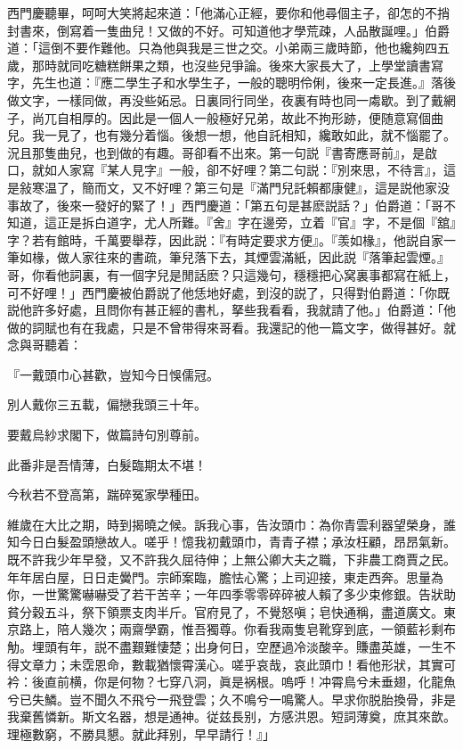 西門慶聽畢，呵呵大笑將起來道：「他滿心正經，要你和他尋個主子，卻怎的不捎封書來，倒寫着一隻曲兒！又做的不好。可知道他才學荒疎，人品散誕哩。」伯爵道：「這倒不要作難他。只為他與我是三世之交。小弟兩三歲時節，他也纔夠四五歲，那時就同吃糖糕餅果之類，也沒些兒爭論。後來大家長大了，上學堂讀書寫字，先生也道：『應二學生子和水學生子，一般的聰明伶俐，後來一定長進。』落後做文字，一樣同做，再没些妬忌。日裏同行同坐，夜裏有時也同一䖏歇。到了戴網子，尚兀自相厚的。因此是一個人一般極好兄弟，故此不拘形跡，便随意寫個曲兒。我一見了，也有幾分着惱。後想一想，他自託相知，纔敢如此，就不惱罷了。況且那隻曲兒，也到做的有趣。哥卻看不出來。第一句説『書寄應哥前』，是啟口，就如人家寫『某人見字』一般，卻不好哩？第二句説：『別來思，不待言』，這是敍寒温了，簡而文，又不好哩？第三句是『滿門兒託賴都康健』，這是説他家没事故了，後來一發好的緊了！」西門慶道：「第五句是甚麽説話？」伯爵道：「哥不知道，這正是拆白道字，尤人所難。『舍』字在邊旁，立着『官』字，不是個『舘』字？若有館時，千萬要舉荐，因此説：『有時定要求方便』。『羡如椽』，他説自家一筆如椽，做人家往來的書疏，筆兒落下去，其煙雲滿紙，因此説『落筆起雲煙。』哥，你看他詞裏，有一個字兒是閒話麽？只這幾句，穩穩把心窝裏事都寫在紙上，可不好哩！」西門慶被伯爵説了他恁地好處，到沒的説了，只得對伯爵道：「你既説他許多好處，且問你有甚正經的書札，拏些我看看，我就請了他。」伯爵道：「他做的詞賦也有在我處，只是不曾带得來哥看。我還記的他一篇文字，做得甚好。就念與哥聽着：

\begin{myquote}
『一戴頭巾心甚歡，豈知今日悞儒冠。

別人戴你三五載，偏戀我頭三十年。

要戴烏紗求閣下，做篇詩句別尊前。

此番非是吾情薄，白髮臨期太不堪！

今秋若不登高第，踹碎冤家學種田。
\end{myquote}

\begin{myquote}
維歲在大比之期，時到揭曉之候。訴我心事，告汝頭巾：為你青雲利器望榮身，誰知今日白髮盈頭戀故人。嗟乎！憶我初戴頭巾，青青子襟；承汝枉顧，昂昂氣新。既不許我少年早發，又不許我久屈待伸；上無公卿大夫之職，下非農工商賈之民。年年居白屋，日日走黌門。宗師案臨，膽怯心驚；上司迎接，東走西奔。思量為你，一世驚驚嚇嚇受了若干苦辛；一年四季零零碎碎被人賴了多少束修銀。告狀助貧分穀五斗，祭下領票支肉半斤。官府見了，不覺怒嗔；皂快通稱，盡道廣文。東京路上，陪人幾次；兩齋學霸，惟吾獨尊。你看我兩隻皂靴穿到底，一領藍衫剩布觔。埋頭有年，説不盡艱難悽楚；出身何日，空歷過冷淡酸辛。賺盡英雄，一生不得文章力；未霑恩命，數載猶懷霄漢心。嗟乎哀哉，哀此頭巾！看他形狀，其實可衿：後直前横，你是何物？七穿八洞，眞是祸根。嗚呼！冲霄鳥兮未垂翅，化龍魚兮已失鱗。豈不聞久不飛兮一飛登雲；久不鳴兮一鳴驚人。早求你脱胎換骨，非是我棄舊憐新。斯文名器，想是通神。従兹長别，方感洪恩。短詞薄奠，庶其來歆。理極數窮，不勝具懇。就此拜别，早早請行！』」
\end{myquote}

